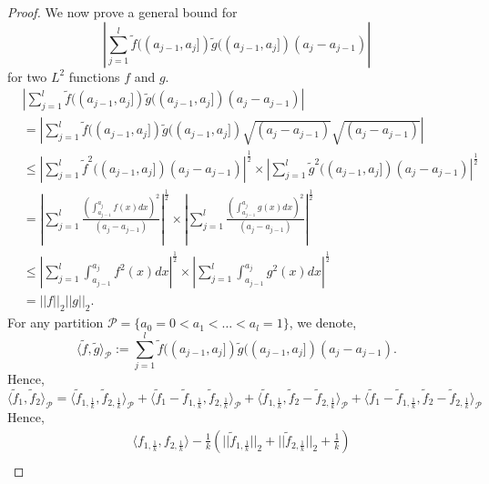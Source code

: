 \documentclass[reqno,12pt]{amsart}
\theoremstyle{plain}
\theoremstyle{definition}
\let\tilde\widetilde
\begin{document}
\begin{proof}
    \noindent
    We now prove a general bound for 
    \[
       \left|\sum_{j=1}^{l} \tilde{f}((a_{j-1},a_{j}]) \tilde{g}((a_{j-1},a_{j}]) (a_{j}-a_{j-1})\right|
    \]
    for two $L^2$ functions $f$ and $g$.
    \begin{equation}\label{eq:bound}
        \begin{split}
         &\left| \sum_{j=1}^{l} \tilde{f}((a_{j-1},a_{j}]) \tilde{g}((a_{j-1},a_{j}]) (a_{j}-a_{j-1})\right|\\
         &= \left| \sum_{j=1}^{l} \tilde{f}((a_{j-1},a_{j}]) \tilde{g}((a_{j-1},a_{j}]) \sqrt{(a_{j}-a_{j-1})} \sqrt{(a_{j}-a_{j-1})}\right|\\
         & \le \left| \sum_{j=1}^{l} \tilde{f}^2((a_{j-1},a_{j}])(a_{j}-a_{j-1}) \right|^{\frac{1}{2}}\times \left| \sum_{j=1}^{l} \tilde{g}^2((a_{j-1},a_{j}])(a_{j}-a_{j-1}) \right|^{\frac{1}{2}} \\
         &= \left| \sum_{j=1}^{l} \frac{\left(\int_{a_{j-1}}^{a_{j}} f(x) dx\right)^2}{(a_{j}-a_{j-1})}\right|^{\frac{1}{2}} \times \left| \sum_{j=1}^{l} \frac{\left(\int_{a_{j-1}}^{a_{j}} g(x) dx\right)^2}{(a_{j}-a_{j-1})}\right|^{\frac{1}{2}}\\
         &\le \left| \sum_{j=1}^{l} \int_{a_{j-1}}^{a_{j}} f^{2}(x)dx \right|^{\frac{1}{2}} \times \left| \sum_{j=1}^{l} \int_{a_{j-1}}^{a_{j}} g^{2}(x)dx \right|^{\frac{1}{2}}\\
         & = ||f||_{2}||g||_{2}.
        \end{split}
    \end{equation}
    For any partition $\mathcal{P}=\{ a_{0}=0< a_{1}< \ldots < a_{l}=1 \}$, we denote, 
    \[
    \langle \tilde{f}, \tilde{g} \rangle_{\mathcal{P}}:= \sum_{j=1}^{l} \tilde{f}((a_{j-1},a_{j}]) \tilde{g}((a_{j-1},a_{j}]) (a_{j}-a_{j-1}).
    \]
    Hence,
    \begin{equation}
         \langle \tilde{f}_{1}, \tilde{f}_{2} \rangle_{\mathcal{P}}=  \langle \tilde{f}_{1,\frac{1}{k}}, \tilde{f}_{2, \frac{1}{k}} \rangle_{\mathcal{P}} + \langle \tilde{f}_{1}-\tilde{f}_{1,\frac{1}{k}}, \tilde{f}_{2, \frac{1}{k}} \rangle_{\mathcal{P}} + \langle \tilde{f}_{1,\frac{1}{k}}, \tilde{f}_{2}-\tilde{f}_{2, \frac{1}{k}} \rangle_{\mathcal{P}} + \langle \tilde{f}_{1}-\tilde{f}_{1,\frac{1}{k}}, \tilde{f}_{2}-\tilde{f}_{2, \frac{1}{k}} \rangle_{\mathcal{P}}
    \end{equation}
    Hence, 
    \begin{equation} \label{eq:compare}
        \begin{split}
     &\langle {f}_{1,\frac{1}{k}}, {f}_{2, \frac{1}{k}} \rangle - \frac{1}{k}\left( ||\tilde{f}_{1, \frac{1}{k}}||_{2} +  ||\tilde{f}_{2, \frac{1}{k}}||_{2} + \frac{1}{k}\right)\\

\end{split}
\end{equation}
\end{proof}
\end{document}
